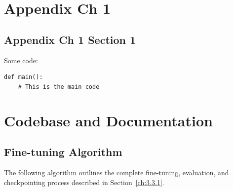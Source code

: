 \appendix
\addappheadtotoc

\chapter{Appendix Ch 1}\label{appx:ch1}
\lipsum[1-2]

\section{Appendix Ch 1 Section 1}\label{appx:c1s1}
Some code:
\begin{lstlisting}
def main():
    # This is the main code
\end{lstlisting}

\chapter{Codebase and Documentation}\label{app:codebase}

\lipsum[1]

\section{Fine-tuning Algorithm}\label{app:finetune}
The following algorithm outlines the complete fine-tuning, evaluation, and checkpointing process described in Section~\ref{ch:3.3.1}.

